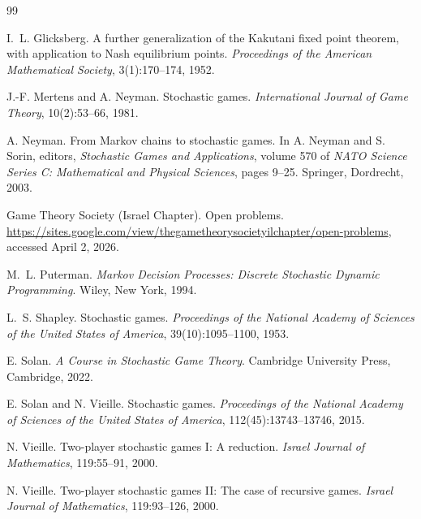 \documentclass[11pt]{article}
\theoremstyle{definition}
\newcommand{\1}{\mathbf{1}}
\begin{document}
\begin{thebibliography}{99}

I.~L. Glicksberg.
\newblock A further generalization of the Kakutani fixed point theorem, with application to Nash equilibrium points.
\newblock \emph{Proceedings of the American Mathematical Society}, 3(1):170--174, 1952.

J.-F. Mertens and A. Neyman.
\newblock Stochastic games.
\newblock \emph{International Journal of Game Theory}, 10(2):53--66, 1981.

A. Neyman.
\newblock From {M}arkov chains to stochastic games.
\newblock In A. Neyman and S. Sorin, editors, \emph{Stochastic Games and Applications}, volume 570 of \emph{NATO Science Series C: Mathematical and Physical Sciences}, pages 9--25. Springer, Dordrecht, 2003.

Game Theory Society (Israel Chapter).
\newblock Open problems.
\newblock \url{https://sites.google.com/view/thegametheorysocietyilchapter/open-problems}, accessed April 2, 2026.

M.~L. Puterman.
\newblock \emph{Markov Decision Processes: Discrete Stochastic Dynamic Programming}.
\newblock Wiley, New York, 1994.

L.~S. Shapley.
\newblock Stochastic games.
\newblock \emph{Proceedings of the National Academy of Sciences of the United States of America}, 39(10):1095--1100, 1953.

E. Solan.
\newblock \emph{A Course in Stochastic Game Theory}.
\newblock Cambridge University Press, Cambridge, 2022.

E. Solan and N. Vieille.
\newblock Stochastic games.
\newblock \emph{Proceedings of the National Academy of Sciences of the United States of America}, 112(45):13743--13746, 2015.

N. Vieille.
\newblock Two-player stochastic games {I}: A reduction.
\newblock \emph{Israel Journal of Mathematics}, 119:55--91, 2000.

N. Vieille.
\newblock Two-player stochastic games {II}: The case of recursive games.
\newblock \emph{Israel Journal of Mathematics}, 119:93--126, 2000.

\end{thebibliography}
\end{document}
